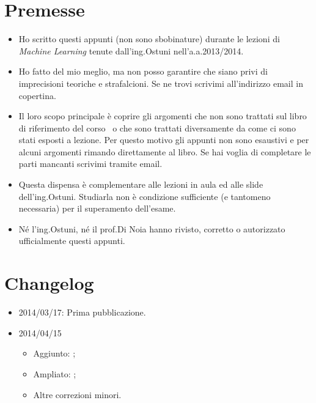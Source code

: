 \section*{Premesse}
\begin{itemize}
\item Ho scritto questi appunti (non sono sbobinature) durante le lezioni di \emph{Machine Learning }tenute dall'ing.\@ Ostuni nell'a.a.\@ 2013/2014. 

\item Ho fatto del mio meglio, ma non posso garantire che siano privi di imprecisioni teoriche e strafalcioni. Se ne trovi scrivimi all'indirizzo email in copertina.

\item Il loro scopo principale è coprire gli argomenti che non sono trattati sul libro di riferimento del corso~\cite{AIMA} o che sono trattati diversamente da come ci sono stati esposti a lezione. Per questo motivo gli appunti non sono esaustivi e per alcuni argomenti rimando direttamente al libro. Se hai voglia di completare le parti mancanti scrivimi tramite email.

\item Questa dispensa è complementare alle lezioni in aula ed alle slide dell'ing.\@  Ostuni. Studiarla non è condizione sufficiente (e tantomeno necessaria) per il superamento dell'esame.

\item Né l'ing.\@  Ostuni, né il prof.\@  Di Noia hanno rivisto, corretto o autorizzato ufficialmente questi appunti.
\end{itemize}

\section*{Changelog}

\begin{itemize}
    \item 2014/03/17: Prima pubblicazione.
    
    \item 2014/04/15 \begin{itemize}
        \item Aggiunto: ;
        \item Ampliato: ;
        \item Altre correzioni minori.
     \end{itemize}
\end{itemize}

